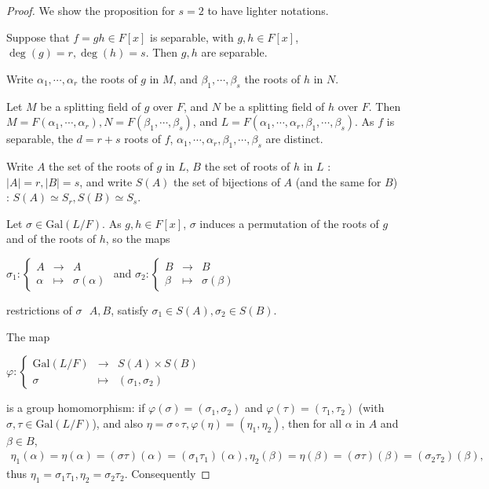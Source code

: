 \documentclass[11pt,a4paper]{article}
\newcommand{\Gal}{\mathrm{Gal}}
\begin{document}
\begin{proof}
We show the proposition for $s=2$ to have lighter notations.

Suppose that $f = gh\in F[x]$ is separable, with $g,h \in F[x]$, $\deg(g)=r,\deg(h)=s$. Then $g,h$ are separable.

 Write $\alpha_1,\cdots,\alpha_{r}$ the roots of $g$ in $M$, and $\beta_1,\cdots,\beta_{s}$ the roots of $h$ in $N$. 

Let $M$ be a splitting field of $g$ over $F$, and $N$ be a splitting field of $h$ over $F$.
Then $M=F(\alpha_1,\cdots,\alpha_r), N = F(\beta_1,\cdots,\beta_{s})$, and  $L=F(\alpha_1,\cdots,\alpha_{r}, \beta_1,\cdots,\beta_{s})$. As $f$ is separable, the $d=r+s$ roots of $f$, $\alpha_1, \cdots,\alpha_{r},\beta_1,\cdots,\beta_{s}$ are distinct.

Write $A$ the set of the roots of $g$ in $L$, $B$ the set of roots of $h$ in $L$ : $\vert A \vert = r, \vert B \vert = s$, and write $S(A)$ the set of bijections of $A$ (and the same for $B$) : $S(A)\simeq S_r, S(B) \simeq S_s$.

Let $\sigma \in \Gal(L/F)$. As $g,h \in F[x]$, $\sigma$ induces a permutation of the roots of $g$ and of the roots of $h$, so the maps
\begin{center}
$\sigma_1 : 
\left\{
\begin{array}{ccc}
A  &\to   &  A \\
  \alpha&  \mapsto  &   \sigma(\alpha) 
\end{array}
\right.
$ and
$\sigma_2 : 
\left\{
\begin{array}{ccc}
B  &\to   &  B \\
  \beta&  \mapsto  &   \sigma(\beta) 
\end{array}
\right.
$
\end{center}
restrictions  of $\sigma$  $A,B$, satisfy $\sigma_1 \in S(A), \sigma_2 \in S(B)$.

The map
\begin{center}
$\varphi : 
\left\{
\begin{array}{ccc}
\Gal(L/F) &\to   &  S(A)\times S(B) \\
  \sigma&  \mapsto  &  (\sigma_1,\sigma_2)
\end{array}
\right.
$
\end{center}
is a group homomorphism: if $\varphi(\sigma) = (\sigma_1,\sigma_2)$ and $\varphi(\tau) = (\tau_1,\tau_2)$ (with $\sigma,\tau \in \Gal(L/F)$), and also $\eta = \sigma \circ \tau, \varphi(\eta) = (\eta_1,\eta_2)$, then for all $\alpha$ in $A$ and $\beta \in B$, 
\begin{align*}
\eta_1(\alpha) = \eta(\alpha) = (\sigma  \tau)(\alpha) = (\sigma_1  \tau_1)(\alpha) , \eta_2(\beta) = \eta(\beta) = (\sigma  \tau)(\beta) =(\sigma_2  \tau_2)(\beta),
\end{align*}
thus $\eta_1 = \sigma_1\tau_1, \eta_2 = \sigma_2\tau_2$. Consequently 


\end{proof}
\end{document}
